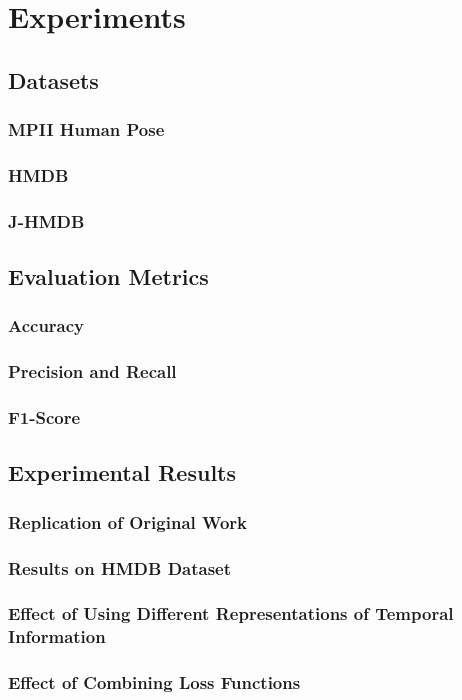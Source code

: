 \chapter{Experiments}

\section{Datasets}
\subsection{MPII Human Pose}
\label{sec:exp-mpii}

\subsection{HMDB}

\subsection{J-HMDB}


\section{Evaluation Metrics}
\subsection{Accuracy}

\subsection{Precision and Recall}

\subsection{F1-Score}


\section{Experimental Results}
\subsection{Replication of Original Work}

\subsection{Results on HMDB Dataset}

\subsection{Effect of Using Different Representations of Temporal Information}

\subsection{Effect of Combining Loss Functions}